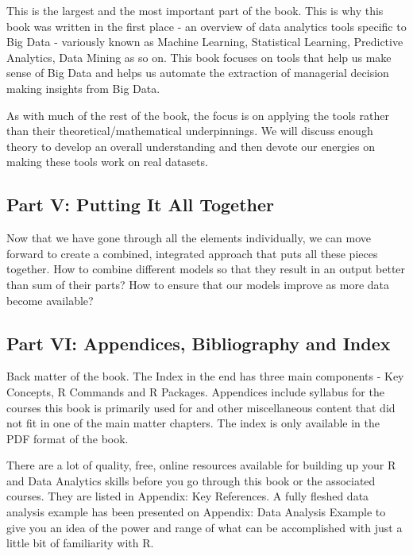 \documentclass[]{krantz}
\theoremstyle{definition}
\theoremstyle{definition}
\theoremstyle{definition}
\theoremstyle{remark}
\begin{document}
This is the largest and the most important part of the book. This is why
this book was written in the first place - an overview of data analytics
tools specific to Big Data - variously known as Machine Learning,
Statistical Learning, Predictive Analytics, Data Mining as so on. This
book focuses on tools that help us make sense of Big Data and helps us
automate the extraction of managerial decision making insights from Big
Data.

As with much of the rest of the book, the focus is on applying the tools
rather than their theoretical/mathematical underpinnings. We will
discuss enough theory to develop an overall understanding and then
devote our energies on making these tools work on real datasets.

\subsection*{Part V: Putting It All
Together}\label{part-v-putting-it-all-together}


Now that we have gone through all the elements individually, we can move
forward to create a combined, integrated approach that puts all these
pieces together. How to combine different models so that they result in
an output better than sum of their parts? How to ensure that our models
improve as more data become available?

\subsection*{Part VI: Appendices, Bibliography and
Index}\label{part-vi-appendices-bibliography-and-index}

Back matter of the book. The Index in the end has three main components
- Key Concepts, R Commands and R Packages. Appendices include syllabus
for the courses this book is primarily used for and other miscellaneous
content that did not fit in one of the main matter chapters. The index
is only available in the PDF format of the book.

There are a lot of quality, free, online resources available for
building up your R and Data Analytics skills before you go through this
book or the associated courses. They are listed in Appendix: Key
References. A fully fleshed data analysis example has been presented on
Appendix: Data Analysis Example to give you an idea of the power and
range of what can be accomplished with just a little bit of familiarity
with R.
\end{document}
